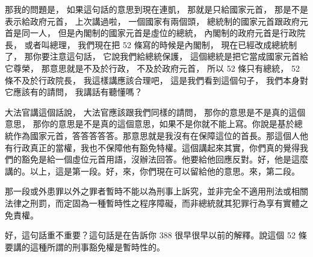 \hypertarget{c11:cue:113}{}那我的問題是，
\hypertarget{c11:cue:114}{}如果這句話的意思到現在連凱，
\hypertarget{c11:cue:115}{}那就是只給國家元首，
\hypertarget{c11:cue:116}{}那是不是表示給政府元首，
\hypertarget{c11:cue:117}{}上次講過啦，
\hypertarget{c11:cue:118}{}一個國家有兩個頭，
\hypertarget{c11:cue:119}{}總統制的國家元首跟政府元首是同一人，
\hypertarget{c11:cue:120}{}但是內閣制的國家元首是虛位的總統，
\hypertarget{c11:cue:121}{}內閣制的政府元首是行政院長，
\hypertarget{c11:cue:122}{}或者叫總理，
\hypertarget{c11:cue:123}{}我們現在把 52 條寫的時候是內閣制，
\hypertarget{c11:cue:124}{}現在已經改成總統制了，
\hypertarget{c11:cue:125}{}那你要注意這句話，
\hypertarget{c11:cue:126}{}它說我們給總統保護，
\hypertarget{c11:cue:127}{}這個總統是把它當成國家元首給它尊榮，
\hypertarget{c11:cue:128}{}那意思就是不及於行政，
\hypertarget{c11:cue:129}{}不及於政府元首，
\hypertarget{c11:cue:130}{}所以 52 條只有總統，
\hypertarget{c11:cue:131}{}52 條不及於行政院長，
\hypertarget{c11:cue:132}{}我這樣講應該合理吧，
\hypertarget{c11:cue:133}{}這是我們看到這個句子，
\hypertarget{c11:cue:134}{}我們本身對它應該有的請問，
\hypertarget{c11:cue:135}{}我講話有聽懂嗎？

\hypertarget{c11:cue:136}{}大法官講這個話說，
\hypertarget{c11:cue:137}{}大法官應該跟我們同樣的請問，
\hypertarget{c11:cue:138}{}那你的意思是不是真的這個意思，
\hypertarget{c11:cue:139}{}那你的意思是不是真的這個意思，如果不是你就不能上寫。你說是基於總統作為國家元首，答答答答答。那意思就是我沒有在保障這位的首長。那這個人他有行政真正的當權，我也不保障他有豁免特權。這個講起來其實，你們真的覺得我們的豁免是給一個虛位元首用語，沒辦法回答。他要給他回應反對。好，他是這麼講的。以上，這是第一段。好，來，你們現在可以留給他的意思。來，第二段。

\hypertarget{c11:cue:140}{}那一段或外患罪以外之罪者暫時不能以為刑事上訴究，並非完全不適用刑法或相關法律之刑罰，而定固為一種暫時性之程序障礙，而非總統就其犯罪行為享有實體之免責權。\par{}好，這句話重不重要？這句話是在告訴你 388 很早很早以前的解釋。說這個 52 條要講的這種所謂的刑事豁免權是暫時性的。

